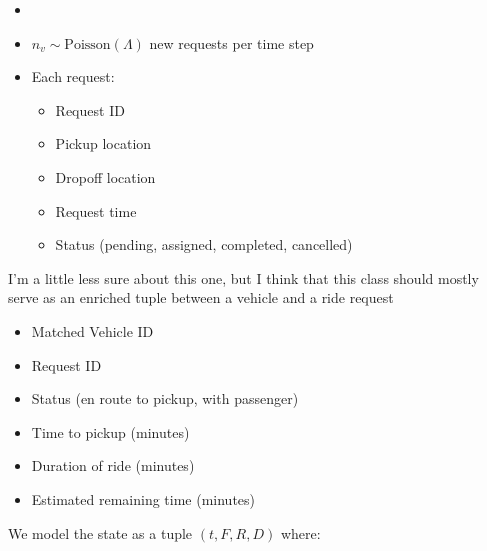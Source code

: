 \documentclass[12pt]{article}
\begin{document}
\begin{itemize}
		\item
\end{itemize}
\begin{itemize}
		\item $n_v \sim \mathrm{Poisson}(\Lambda)$ new requests per time step
		\item Each request:
				\begin{itemize}
						\item Request ID
						\item Pickup location
						\item Dropoff location
						\item Request time
						\item Status (pending, assigned, completed, cancelled)
				\end{itemize}
\end{itemize}
I'm a little less sure about this one, but I think that this class should mostly serve as
an enriched
tuple between a vehicle and a ride request
\begin{itemize}
		\item Matched Vehicle ID
		\item Request ID
		\item Status (en route to pickup, with passenger)
		\item Time to pickup (minutes)
		\item Duration of ride (minutes)
		\item Estimated remaining time (minutes)
\end{itemize}
\newpage
We model the state as a tuple $(t, F, R, D)$ where:
\end{document}
